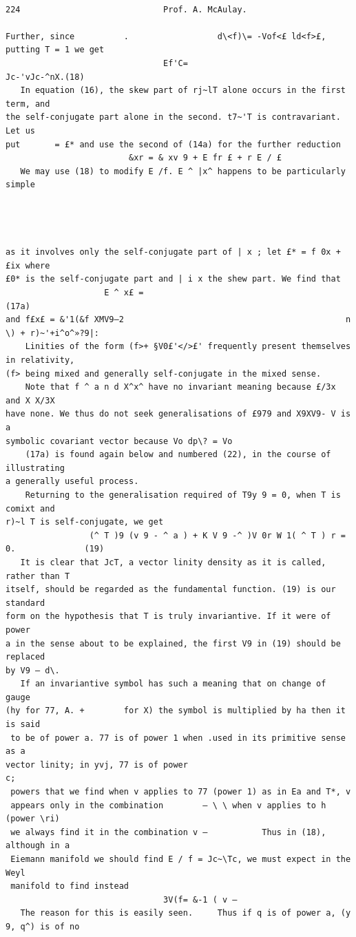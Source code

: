 \documentclass[10pt]{article}
\begin{document}
\clearpage
\begin{verbatim}

224                             Prof. A. McAulay.

Further, since          .                  d\<f)\= -Vof<£ ld<f>£, putting T = 1 we get
                                Ef'C=                                      Jc-'vJc-^nX.(18)
   In equation (16), the skew part of rj~lT alone occurs in the first term, and
the self-conjugate part alone in the second. t7~'T is contravariant. Let us
put       = £* and use the second of (14a) for the further reduction
                         &xr = & xv 9 + E fr £ + r E / £
   We may use (18) to modify E /f. E ^ |x^ happens to be particularly simple




as it involves only the self-conjugate part of | x ; let £* = f 0x + £ix where
£0* is the self-conjugate part and | i x the shew part. We find that
                    E ^ x£ =                                                         (17a)
and f£x£ = &'1(&f XMV9—2                                             n \) + r)~'+i^o^»?9|:
    Linities of the form (f>+ §V0£'</>£' frequently present themselves in relativity,
(f> being mixed and generally self-conjugate in the mixed sense.
    Note that f ^ a n d X^x^ have no invariant meaning because £/3x and X X/3X
have none. We thus do not seek generalisations of £979 and X9XV9- V is a
symbolic covariant vector because Vo dp\? = Vo
    (17a) is found again below and numbered (22), in the course of illustrating
a generally useful process.
    Returning to the generalisation required of T9y 9 = 0, when T is comixt and
r)~l T is self-conjugate, we get
                 (^ T )9 (v 9 - ^ a ) + K V 9 -^ )V 0r W 1( ^ T ) r = 0.              (19)
   It is clear that JcT, a vector linity density as it is called, rather than T
itself, should be regarded as the fundamental function. (19) is our standard
form on the hypothesis that T is truly invariantive. If it were of power
a in the sense about to be explained, the first V9 in (19) should be replaced
by V9 — d\.
   If an invariantive symbol has such a meaning that on change of gauge
(hy for 77, A. +        for X) the symbol is multiplied by ha then it is said
 to be of power a. 77 is of power 1 when .used in its primitive sense as a
vector linity; in yvj, 77 is of power                                   c;
 powers that we find when v applies to 77 (power 1) as in Ea and T*, v
 appears only in the combination        — \ \ when v applies to h (power \ri)
 we always find it in the combination v —           Thus in (18), although in a
 Eiemann manifold we should find E / f = Jc~\Tc, we must expect in the Weyl
 manifold to find instead
                                3V(f= &-1 ( v —
   The reason for this is easily seen.     Thus if q is of power a, (y 9, q^) is of no


\end{verbatim}
\end{document}
